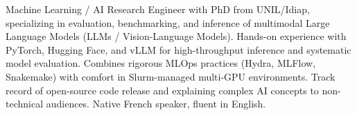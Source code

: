 


\begin{cvparagraph}
Machine Learning / AI Research Engineer with PhD from UNIL/Idiap, specializing in evaluation, benchmarking, and inference of multimodal Large Language Models (LLMs / Vision-Language Models). Hands-on experience with PyTorch, Hugging Face, and vLLM for high-throughput inference and systematic model evaluation. Combines rigorous MLOps practices (Hydra, MLFlow, Snakemake) with comfort in Slurm-managed multi-GPU environments. Track record of open-source code release and explaining complex AI concepts to non-technical audiences. Native French speaker, fluent in English.
\end{cvparagraph}
